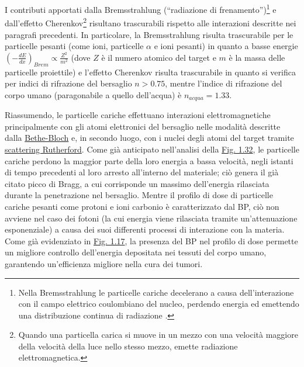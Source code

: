 \documentclass[12pt,a4paper,twoside]{report}
\begin{document}
	I contributi apportati dalla Bremsstrahlung (``radiazione di frenamento'')\footnote{Nella Bremsstrahlung le particelle cariche decelerano a causa dell'interazione con il campo elettrico coulombiano del nucleo, perdendo energia ed emettendo una distribuzione continua di radiazione \cite{testaNotes}.} e dall'effetto Cherenkov\footnote{Quando una particella carica si muove in un mezzo con una velocità maggiore della velocità della luce nello stesso mezzo, emette radiazione elettromagnetica.} risultano trascurabili rispetto alle interazioni descritte nei paragrafi precedenti. In particolare, la Bremsstrahlung risulta trascurabile per le particelle pesanti (come ioni, particelle $\alpha$ e ioni pesanti) in quanto a basse energie $\left(-\frac{dE}{dx}\right)_{Brem}\propto\frac{Z^2}{m^2}$ (dove $Z$ è il numero atomico del target e $m$ è la massa delle particelle proiettile) e l'effetto Cherenkov risulta trascurabile in quanto si verifica per indici di rifrazione del bersaglio $n>0.75$, mentre l'indice di rifrazione del corpo umano (paragonabile a quello dell'acqua) è $n_{acqua}=1.33$.
	
	Riassumendo, le particelle cariche effettuano interazioni elettromagnetiche principalmente con gli atomi elettronici del bersaglio nelle modalità descritte dalla \hyperref[par:bethe_bloch]{Bethe-Bloch} e, in secondo luogo, con i nuclei degli atomi del target tramite \hyperref[par:scattering_Rutherford]{scattering Rutherford}. Come già anticipato nell'analisi della \hyperref[fig:bethe_bloch]{Fig. 1.32}, le particelle cariche perdono la maggior parte della loro energia a bassa velocità, negli istanti di tempo precedenti al loro arresto all'interno del materiale; ciò genera il già citato picco di Bragg, a cui corrisponde un massimo dell'energia rilasciata durante la penetrazione nel bersaglio. Mentre il profilo di dose di particelle cariche pesanti come protoni e ioni carbonio è caratterizzato dal BP, ciò non avviene nel caso dei fotoni (la cui energia viene rilasciata tramite un'attenuazione esponenziale) a causa dei suoi differenti processi di interazione con la materia. Come già evidenziato in \hyperref[fig:photon]{Fig. 1.17}, la presenza del BP nel profilo di dose permette un migliore controllo dell'energia depositata nei tessuti del corpo umano, garantendo un'efficienza migliore nella cura dei tumori.
	
\end{document}
